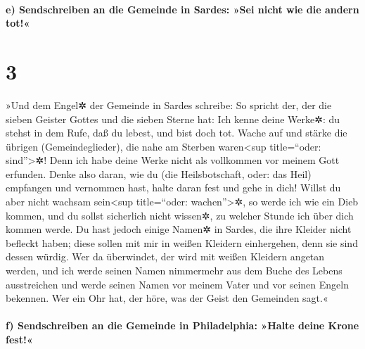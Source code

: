 \hypertarget{e-sendschreiben-an-die-gemeinde-in-sardes-sei-nicht-wie-die-andern-tot}{%
\paragraph{e) Sendschreiben an die Gemeinde in Sardes: »Sei nicht wie
die andern
tot!«}\label{e-sendschreiben-an-die-gemeinde-in-sardes-sei-nicht-wie-die-andern-tot}}

\hypertarget{section-2}{%
\section{3}\label{section-2}}

 »Und dem Engel✲ der Gemeinde in Sardes schreibe: So
spricht der, der die sieben Geister Gottes und die sieben Sterne hat:
Ich kenne deine Werke✲: du stehst in dem Rufe, daß du lebest, und bist
doch tot.  Wache auf und stärke die übrigen
(Gemeindeglieder), die nahe am Sterben waren\textless sup title=``oder:
sind''\textgreater✲! Denn ich habe deine Werke nicht als vollkommen vor
meinem Gott erfunden.  Denke also daran, wie du (die
Heilsbotschaft, oder: das Heil) empfangen und vernommen hast, halte
daran fest und gehe in dich! Willst du aber nicht wachsam
sein\textless sup title=``oder: wachen''\textgreater✲, so werde ich wie
ein Dieb kommen, und du sollst sicherlich nicht wissen✲, zu welcher
Stunde ich über dich kommen werde.  Du hast jedoch einige
Namen✲ in Sardes, die ihre Kleider nicht befleckt haben; diese sollen
mit mir in weißen Kleidern einhergehen, denn sie sind dessen würdig.
 Wer da überwindet, der wird mit weißen Kleidern angetan
werden, und ich werde seinen Namen nimmermehr aus dem Buche des Lebens
ausstreichen und werde seinen Namen vor meinem Vater und vor seinen
Engeln bekennen.  Wer ein Ohr hat, der höre, was der Geist
den Gemeinden sagt.«

\hypertarget{f-sendschreiben-an-die-gemeinde-in-philadelphia-halte-deine-krone-fest}{%
\paragraph{f) Sendschreiben an die Gemeinde in Philadelphia: »Halte
deine Krone
fest!«}\label{f-sendschreiben-an-die-gemeinde-in-philadelphia-halte-deine-krone-fest}}

